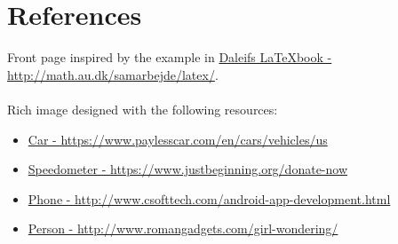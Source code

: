 \documentclass[article, oneside]{memoir}
\begin{document}
\frontmatter



\clearpage

\tableofcontents

\mainmatter









\backmatter

\chapter{References}
Front page inspired by the example in \href{http://math.au.dk/samarbejde/latex/}{Daleifs \LaTeX book - http://math.au.dk/samarbejde/latex/}.\\
\\
Rich image designed with the following resources:
\begin{itemize}
	\item \href{https://www.paylesscar.com/en/cars/vehicles/us}{Car - https://www.paylesscar.com/en/cars/vehicles/us}
	\item \href{https://www.justbeginning.org/donate-now}{Speedometer - https://www.justbeginning.org/donate-now}
	\item \href{http://www.csofttech.com/android-app-development.html}{Phone - http://www.csofttech.com/android-app-development.html}
	\item \href{http://www.romangadgets.com/girl-wondering/}{Person - http://www.romangadgets.com/girl-wondering/}
\end{itemize}
\end{document}
